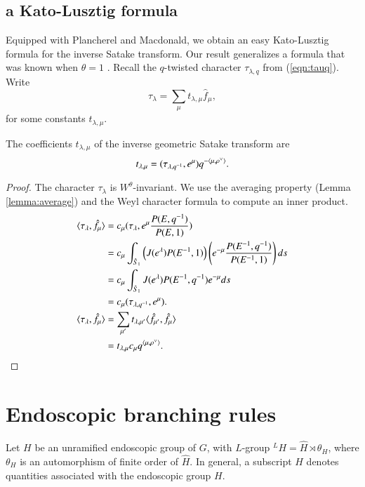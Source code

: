 \subsection{a Kato-Lusztig formula}

Equipped with Plancherel and Macdonald, we obtain an easy Kato-Lusztig
formula for the inverse Satake transform.  Our result generalizes a
formula that was known when $\theta=1$ \cite{kato1982spherical}
\cite{lusztig1983singularities}.  Recall the $q$-twisted character
$\tau_{\lambda,q}$ from (\ref{eqn:tauq}).  Write
\[
\tau_\lambda = \sum_\mu t_{\lambda,\mu}  \hat f_\mu,
\]
for some constants $t_{\lambda,\mu}$.

\begin{theorem}
  The coefficients $t_{\lambda,\mu}$ of the inverse geometric Satake
  transform are
\[
t_{\lambda,\mu} =  (\tau_{\lambda,q^{-1}},e^\mu) q^{-\langle{\mu,\rho^\vee}\rangle}.
\]
\end{theorem}

\begin{proof}
  The character $\tau_\lambda$ is $W^\theta$-invariant.  We use the
  averaging property (Lemma \ref{lemma:average}) and the Weyl
  character formula to compute an inner product.
\begin{align*}
\langle{\tau_\lambda,\hat f_\mu}\rangle
&=c_\mu(\tau_\lambda,e^\mu \frac{P(E,q^{-1})}{P(E,1)})\\
&=c_\mu\int_{\hat S_1} \left(J(e^\lambda) P(E^{-1},1)\right) 
\left( e^{-\mu}\frac{P(E^{-1},q^{-1})}{P(E^{-1},1)} \right) ds\\
&=
c_\mu\int_{\hat S_1} J(e^\lambda) P(E^{-1},q^{-1}) e^{-\mu} ds\\
&= c_\mu(\tau_{\lambda,q^{-1}},e^\mu).\\
\langle{\tau_\lambda,\hat f_\mu}\rangle
&=\sum_{\mu'} t_{\lambda,\mu'} \langle{\hat f_{\mu'},\hat f_\mu}\rangle \\
&= t_{\lambda,\mu} c_\mu q^{\langle{\mu,\rho^\vee}\rangle}.
\end{align*}
\end{proof}


\section{Endoscopic branching rules}\label{sec:branch}

Let $H$ be an unramified endoscopic group of $G$, with $L$-group
${}^LH = \hat H \rtimes \theta_H$, where $\theta_H$ is an automorphism
of finite order of $\hat H$.  In general, a subscript $H$ denotes
quantities associated with the endoscopic group $H$.

